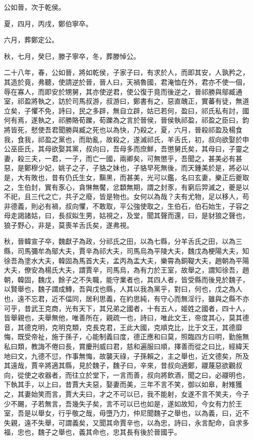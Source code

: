 \begin{pinyinscope}
公如晉，次于乾侯。

夏，四月，丙戌，鄭伯寧卒。

六月，葬鄭定公。

秋，七月，癸巳，滕子寧卒，冬，葬滕悼公。

二十八年，春，公如晉，將如乾侯，子家子曰，有求於人，而即其安，人孰矜之，其造於竟，弗聽，使請逆於晉，晉人曰，天禍魯國，君淹恤在外，君亦不使一個，辱在寡人，而即安於甥舅，其亦使逆君，使公復于竟而後逆之，晉祁勝與鄔臧通室，祁盈將執之，訪於司馬叔游，叔游曰，鄭書有之，惡直醜正，實蕃有徒，無道立矣，子懼不免，詩曰，民之多辟，無自立辟，姑已若何，盈曰，祁氏私有討，國何有焉，遂執之，祁勝賂荀躒，荀躒為之言於晉侯，晉侯執祁盈，祁盈之臣曰，鈞將皆死，憖使吾君聞勝與臧之死也以為快，乃殺之，夏，六月，晉殺祁盈及楊食我，食我，祁盈之黨也，而助亂，故殺之，遂滅祁氏，羊舌氏，初，叔向欲娶於申公巫臣氏，其母欲娶其黨，叔向曰，吾母多而庶鮮，吾懲舅氏矣，其母曰，子靈之妻，殺三夫，一君，一子，而亡一國，兩卿矣，可無懲乎，吾聞之，甚美必有甚惡，是鄭穆少妃，姚子之子，子貉之妹也，子貉早死無後，而天鍾美於是，將必以是，大有敗也，昔有仍氏生女，黰黑，而甚美，光可以鑑，名曰玄妻，樂正后夔取之，生伯封，實有豕心，貪惏無饜，忿纇無期，謂之封豕，有窮后羿滅之，夔是以不祀，且三代之亡，共子之廢，皆是物也。女何以為哉？夫有尤物，足以移人，苟非德義，則必有禍，叔向懼，不敢取，平公強使取之，生伯石，伯石始生，子容之母走謁諸姑，曰，長叔姒生男，姑視之，及堂，聞其聲而還，曰，是豺狼之聲也，狼子野心，非是，莫喪羊舌氏矣，遂弗視。

秋，晉韓宣子卒，魏獻子為政，分祁氏之田，以為七縣，分羊舌氏之田，以為三縣，司馬彌牟為鄔大夫，賈辛為祁大夫，司馬烏為平陵大夫，魏戊為梗陽大夫，知徐吾為塗水大夫，韓固為馬首大夫，孟丙為盂大夫，樂霄為銅鞮大夫，趙朝為平陽大夫，僚安為楊氏大夫，謂賈辛，司馬烏，為有力於王室，故舉之，謂知徐吾，趙朝，韓固，魏戊，餘子之不失職，能守業者也，其四人者，皆受縣而後見於魏子，以賢舉也，魏子謂成鱄，吾與戊也縣，人其以我為黨乎，對曰，何也，戊之為人也，遠不忘君，近不偪同，居利思義，在約思純，有守心而無淫行，雖與之縣不亦可乎，昔武王克商，光有天下，其兄弟之國者，十有五人，姬姓之國者，四十人，皆舉親也，夫舉無他，唯善所在，親疏一也，詩曰，唯此文王，帝度其心，莫其德音，其德克明，克明克類，克長克君，王此大國，克順克比，比于文王，其德靡悔，既受帝祉，施于孫子，心能制義曰度，德正應和曰莫，照臨四方曰明，勤施無私曰類，教誨不倦曰長，賞慶刑威曰君，慈和遍服曰順，擇善而從之曰比，經緯天地曰文，九德不愆，作事無悔，故襲天祿，子孫賴之，主之舉也，近文德矣，所及其遠哉，賈辛將適其縣，見於魏子，魏子曰，辛來，昔叔向適鄭，鬷蔑惡欲觀叔向，從使之收器者，而往立於堂下，一言而善，叔向將飲酒，聞之曰，必鬷明也，下執其手，以上曰，昔賈大夫惡，娶妻而美，三年不言不笑，御以如皋，射雉獲之，其妻始笑而言，賈大夫曰，才之不可以已，我不能射，女遂不言不笑夫，今子少不颺，子若無言，吾幾失子矣，言不可以已也如是，遂如故知，今女有力於王室，吾是以舉女，行乎敬之哉，毋墮乃力，仲尼聞魏子之舉也，以為義，曰，近不失親，遠不失舉，可謂義矣，又聞其命賈辛也，以為忠，詩曰，永言配命，自求多福，忠也，魏子之舉也，義其命也，忠其長有後於晉國乎。


\end{pinyinscope}

